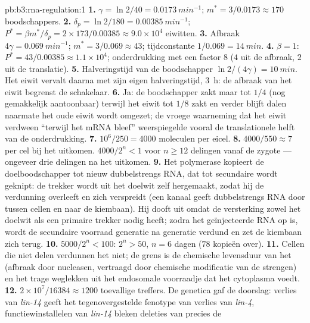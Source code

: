 \begin{solution}{pb:b3:rna-regulation:1}
\textbf{1.} $\gamma = \ln 2/40 = \qty{0.0173}{min^{-1}}$; $m^{*} =
3/0.0173 \approx 170$ boodschappers.
\textbf{2.} $\delta_{p} = \ln 2/180 = \qty{0.00385}{min^{-1}}$; $P^{*} =
\beta m^{*}/\delta_{p} = 2\times 173/0.00385 \approx 9.0\times 10^{4}$
eiwitten.
\textbf{3.} Afbraak $4\gamma = \qty{0.069}{min^{-1}}$; $m^{*} = 3/0.069
\approx 43$; tijdconstante $1/0.069 = \qty{14}{min}$.
\textbf{4.} $\beta = 1$: $P^{*} = 43/0.00385 \approx 1.1\times 10^{4}$;
onderdrukking met een factor $8$ ($4$ uit de afbraak, $2$ uit de
translatie).
\textbf{5.} Halveringstijd van de boodschapper $\ln 2/(4\gamma) = \qty{10}{min}$.
Het eiwit vervalt daarna met zijn eigen halveringstijd, \qty{3}{h}: de
afbraak van het eiwit begrenst de schakelaar.
\textbf{6.} Ja: de boodschapper zakt maar tot $1/4$ (nog gemakkelijk
aantoonbaar) terwijl het eiwit tot $1/8$ zakt en verder blijft dalen
naarmate het oude eiwit wordt omgezet; de vroege waarneming dat het
eiwit verdween ``terwijl het mRNA bleef'' weerspiegelde vooral de
translationele helft van de onderdrukking.
\textbf{7.} $10^{6}/250 = 4000$ moleculen per eicel.
\textbf{8.} $4000/550 \approx 7$ per cel bij het uitkomen. $4000/2^{n} < 1$
voor $n \ge 12$ delingen vanaf de zygote --- ongeveer drie delingen na
het uitkomen.
\textbf{9.} Het polymerase kopieert de doelboodschapper tot nieuw
dubbelstrengs RNA, dat tot secundaire  wordt geknipt: de trekker
wordt uit het doelwit zelf hergemaakt, zodat hij de verdunning
overleeft en zich verspreidt (een kanaal geeft dubbelstrengs RNA door
tussen cellen en naar de kiembaan). Hij dooft uit omdat de versterking
zowel het doelwit als een primaire trekker nodig heeft; zodra het
geïnjecteerde RNA op is, wordt de secundaire voorraad generatie na
generatie verdund en zet de kiembaan zich terug.
\textbf{10.} $5000/2^{n} < 100$: $2^{n} > 50$, $n = 6$ dagen ($78$
kopieën over).
\textbf{11.} Cellen die niet delen verdunnen het  niet; de grens is
de chemische levensduur van het  (afbraak door nucleasen, vertraagd
door chemische modificatie van de strengen) en het trage weglekken uit
het endosomale voorraadje dat het cytoplasma voedt.
\textbf{12.} $2\times 10^{7}/\num{16384} \approx \num{1200}$ toevallige
treffers. De genetica gaf de doorslag: verlies van \emph{lin-14} geeft
het tegenovergestelde fenotype van verlies van \emph{lin-4},
functiewinstallelen van \emph{lin-14} bleken deleties van precies de

\end{solution}
